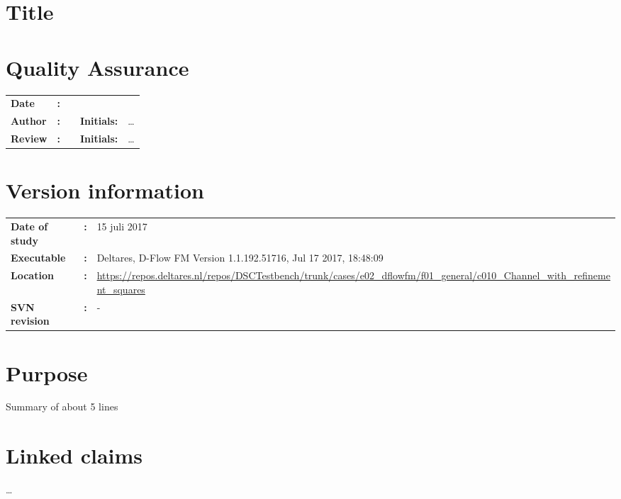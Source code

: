 \section{Title}
\newrefsegment

\section*{Quality Assurance}
\begin{tabular}{@{}p{27mm}@{}p{0mm}p{\textwidth-52mm-48pt}p{15mm}p{10mm}}
\textbf{Date} & \textbf{:} &   \\ 
\textbf{Author} & \textbf{:} &   & \textbf{Initials:} & \ldots \\ 
\textbf{Review} & \textbf{:} &   & \textbf{Initials:} & \ldots 
\end{tabular}

\section*{Version information}
\begin{tabular}{@{}p{23mm}@{}p{0mm}p{\textwidth-23mm-30pt}}
\textbf{Date of study}& \textbf{:} & 15 juli 2017 \\
\textbf{Executable}   & \textbf{:} & Deltares, D-Flow FM Version 1.1.192.51716, Jul 17 2017, 18:48:09 \\
\textbf{Location}     & \textbf{:} & \url{https://repos.deltares.nl/repos/DSCTestbench/trunk/cases/e02_dflowfm/f01_general/c010_Channel_with_refinement_squares} \\ 
\textbf{SVN revision} & \textbf{:} & -
\end{tabular}

\section*{Purpose}
Summary of about 5 lines

\section*{Linked claims}
\ldots

